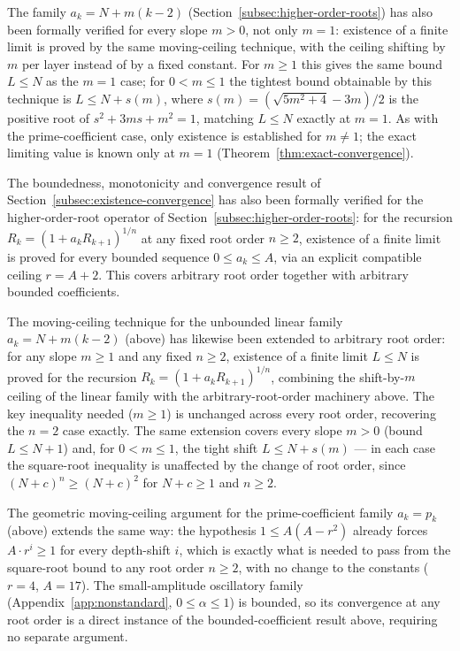 \documentclass[11pt,a4paper]{amsart}
\theoremstyle{plain}
\theoremstyle{definition}
\theoremstyle{remark}
\begin{document}
The family $a_k=N+m(k-2)$ (Section~\ref{subsec:higher-order-roots}) has also been formally verified for every slope $m>0$, not only $m=1$: existence of a finite limit is proved by the same moving-ceiling technique, with the ceiling shifting by $m$ per layer instead of by a fixed constant. For $m \ge 1$ this gives the same bound $L\le N$ as the $m=1$ case; for $0<m\le 1$ the tightest bound obtainable by this technique is $L \le N+s(m)$, where $s(m)=(\sqrt{5m^2+4}-3m)/2$ is the positive root of $s^2+3ms+m^2=1$, matching $L\le N$ exactly at $m=1$. As with the prime-coefficient case, only existence is established for $m\ne 1$; the exact limiting value is known only at $m=1$ (Theorem~\ref{thm:exact-convergence}).

The boundedness, monotonicity and convergence result of Section~\ref{subsec:existence-convergence} has also been formally verified for the higher-order-root operator of Section~\ref{subsec:higher-order-roots}: for the recursion $R_k=(1+a_k R_{k+1})^{1/n}$ at any fixed root order $n \ge 2$, existence of a finite limit is proved for every bounded sequence $0 \le a_k \le A$, via an explicit compatible ceiling $r=A+2$. This covers arbitrary root order together with arbitrary bounded coefficients.

The moving-ceiling technique for the unbounded linear family $a_k=N+m(k-2)$ (above) has likewise been extended to arbitrary root order: for any slope $m \ge 1$ and any fixed $n \ge 2$, existence of a finite limit $L \le N$ is proved for the recursion $R_k=(1+a_k R_{k+1})^{1/n}$, combining the shift-by-$m$ ceiling of the linear family with the arbitrary-root-order machinery above. The key inequality needed ($m \ge 1$) is unchanged across every root order, recovering the $n=2$ case exactly. The same extension covers every slope $m>0$ (bound $L\le N+1$) and, for $0<m\le 1$, the tight shift $L\le N+s(m)$ — in each case the square-root inequality is unaffected by the change of root order, since $(N+c)^n\ge (N+c)^2$ for $N+c\ge 1$ and $n\ge 2$.

The geometric moving-ceiling argument for the prime-coefficient family $a_k=p_k$ (above) extends the same way: the hypothesis $1\le A(A-r^2)$ already forces $A\cdot r^i\ge 1$ for every depth-shift $i$, which is exactly what is needed to pass from the square-root bound to any root order $n\ge 2$, with no change to the constants ($r=4$, $A=17$). The small-amplitude oscillatory family (Appendix~\ref{app:nonstandard}, $0\le\alpha\le 1$) is bounded, so its convergence at any root order is a direct instance of the bounded-coefficient result above, requiring no separate argument.
\end{document}
